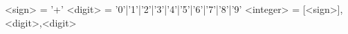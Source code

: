 \documentclass{article}
\begin{document}
\begin{grammar}
    <sign> = 	'+'
    <digit> = 	'0'|'1'|'2'|'3'|'4'|'5'|'6'|'7'|'8'|'9'
    <integer> = 	[<sign>],<digit>,{<digit>}
    \end{grammar}
\end{document}
